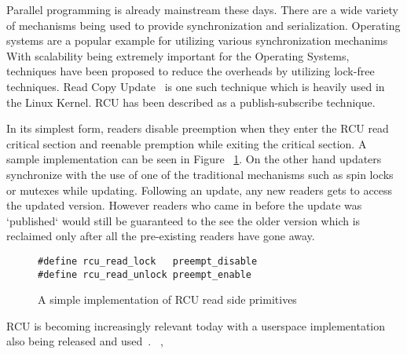 Parallel programming is already mainstream these days. There are a wide variety
of mechanisms being used to provide synchronization and serialization.
Operating systems are a popular example for utilizing various synchronization
mechanims%
With scalability being extremely important for the Operating Systems,
techniques have been proposed to reduce the overheads by utilizing lock-free
techniques. Read Copy Update~\cite{paulmck:TechReport} is one such technique which is
heavily used in the Linux Kernel. RCU has been described as a publish-subscribe
technique.

In its simplest form, readers disable preemption when they enter the RCU read critical
section and reenable premption while exiting the
critical section. A sample implementation can be seen in Figure ~\ref{fig:rcusimpleread}.
On the other hand updaters synchronize with the use
of one of the traditional mechanisms such as spin locks or mutexes while updating.
Following an update, any new readers gets to access the updated version. However
readers who came in before the update was `published` would still be guaranteed
to the see the older version which is reclaimed only after all the pre-existing
readers have gone away.

\begin{figure}[h]
\centering
\begin{lstlisting}
#define rcu_read_lock	preempt_disable
#define rcu_read_unlock	preempt_enable
\end{lstlisting}
\caption{A simple implementation of RCU read side primitives}\label{fig:rcusimpleread}
\end{figure}

RCU is becoming increasingly relevant today with a userspace implementation also
being released and used~\cite{urcu}.%
~\cite{goulet:thesis},~\cite{urcu-crowd}


